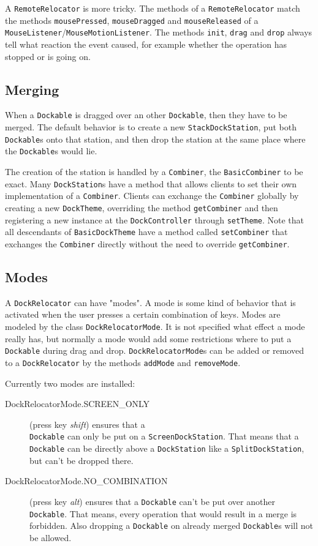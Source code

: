 \documentclass[a4paper,10pt]{article}
\newcommand{\src}[1]{\lstinline[basicstyle=\normalsize\ttfamily,keywordstyle=\normalsize\ttfamily,identifierstyle=\normalsize\ttfamily]|#1|}
\begin{document}
A \src{RemoteRelocator} is more tricky. The methods of a \src{RemoteRelocator} match the methods \src{mousePressed}, \src{mouseDragged} and \src{mouseReleased} of a \src{MouseListener}/\src{MouseMotionListener}. The methods \src{init}, \src{drag} and \src{drop} always tell what reaction the event caused, for example whether the operation has stopped or is going on.

\subsection{Merging}
When a \src{Dockable} is dragged over an other \src{Dockable}, then they have to be merged. The default behavior is to create a new \src{StackDockStation}, put both \src{Dockable}s onto that station, and then drop the station at the same place where the \src{Dockable}s would lie.

The creation of the station is handled by a \src{Combiner}, the \src{BasicCombiner} to be exact. Many \src{DockStation}s have a method that allows clients to set their own implementation of a \src{Combiner}. Clients can exchange the \src{Combiner} globally by creating a new \src{DockTheme}, overriding the method \src{getCombiner} and then registering a new instance at the \src{DockController} through \src{setTheme}. Note that all descendants of \src{BasicDockTheme} have a method called \src{setCombiner} that exchanges the \src{Combiner} directly without the need to override \src{getCombiner}.

\subsection{Modes}
A \src{DockRelocator} can have "modes". A mode is some kind of behavior that is activated when the user presses a certain combination of keys. Modes are modeled by the class \src{DockRelocatorMode}. It is not specified what effect a mode really has, but normally a mode would add some restrictions where to put a \src{Dockable} during drag and drop. \src{DockRelocatorMode}s can be added or removed to a \src{DockRelocator} by the methods \src{addMode} and \src{removeMode}.

Currently two modes are installed:
\begin{description}
\item[DockRelocatorMode.SCREEN\_ONLY] (press key \textit{shift}) ensures that a \\\src{Dockable} can only be put on a \src{ScreenDockStation}. That means that a \src{Dockable} can be directly above a \src{DockStation} like a \src{SplitDockStation}, but can't be dropped there.
\item[DockRelocatorMode.NO\_COMBINATION] (press key \textit{alt}) ensures that a \src{Dockable} can't be put over another \src{Dockable}. That means, every operation that would result in a merge is forbidden. Also dropping a \src{Dockable} on already merged \src{Dockable}s will not be allowed.
\end{description}
\end{document}
